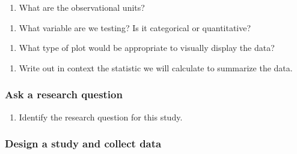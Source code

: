 \documentclass[
]{report}
\providecommand{\tightlist}{%
  \setlength{\itemsep}{0pt}\setlength{\parskip}{0pt}}
\begin{document}
\begin{enumerate}
\def\labelenumi{\arabic{enumi}.}
\tightlist
\item
  What are the observational units?
\end{enumerate}

\vspace{0.5in}

\begin{enumerate}
\def\labelenumi{\arabic{enumi}.}
\setcounter{enumi}{1}
\tightlist
\item
  What variable are we testing? Is it categorical or quantitative?
\end{enumerate}

\vspace{0.5in}

\begin{enumerate}
\def\labelenumi{\arabic{enumi}.}
\setcounter{enumi}{2}
\tightlist
\item
  What type of plot would be appropriate to visually display the data?
\end{enumerate}

\vspace{0.5in}

\begin{enumerate}
\def\labelenumi{\arabic{enumi}.}
\setcounter{enumi}{3}
\tightlist
\item
  Write out in context the statistic we will calculate to summarize the data.
\end{enumerate}

\vspace{0.5in}

\hypertarget{ask-a-research-question}{%
\subsubsection*{Ask a research question}\label{ask-a-research-question}}

\begin{enumerate}
\def\labelenumi{\arabic{enumi}.}
\setcounter{enumi}{4}
\tightlist
\item
  Identify the research question for this study.
\end{enumerate}

\vspace{1in}

\hypertarget{design-a-study-and-collect-data}{%
\subsubsection*{Design a study and collect data}\label{design-a-study-and-collect-data}}
\end{document}
